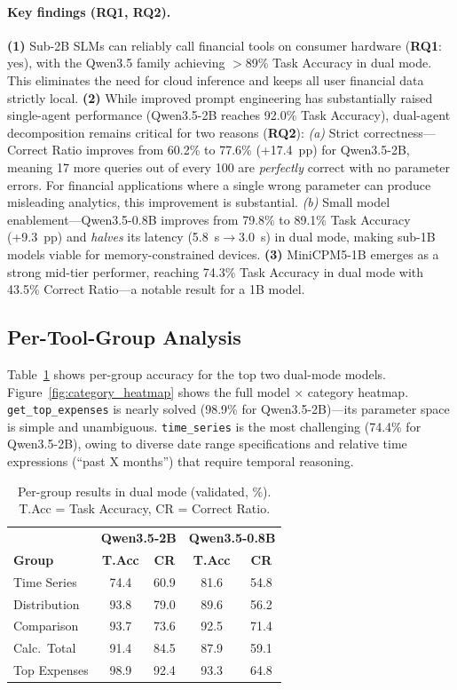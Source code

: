 \documentclass[11pt,twocolumn]{article}
\begin{document}
\paragraph{Key findings (RQ1, RQ2).}
\textbf{(1)} Sub-2B SLMs can reliably call financial tools on consumer hardware (\textbf{RQ1}: yes), with the Qwen3.5 family achieving $>$89\% Task Accuracy in dual mode.
This eliminates the need for cloud inference and keeps all user financial data strictly local.
\textbf{(2)} While improved prompt engineering has substantially raised single-agent performance (Qwen3.5-2B reaches 92.0\% Task Accuracy), dual-agent decomposition remains critical for two reasons (\textbf{RQ2}):
\emph{(a)} Strict correctness---Correct Ratio improves from 60.2\% to 77.6\% (+17.4~pp) for Qwen3.5-2B, meaning 17 more queries out of every 100 are \emph{perfectly} correct with no parameter errors.
For financial applications where a single wrong parameter can produce misleading analytics, this improvement is substantial.
\emph{(b)} Small model enablement---Qwen3.5-0.8B improves from 79.8\% to 89.1\% Task Accuracy (+9.3~pp) and \emph{halves} its latency (5.8~s$\to$3.0~s) in dual mode, making sub-1B models viable for memory-constrained devices.
\textbf{(3)} MiniCPM5-1B emerges as a strong mid-tier performer, reaching 74.3\% Task Accuracy in dual mode with 43.5\% Correct Ratio---a notable result for a 1B model.

\subsection{Per-Tool-Group Analysis}

Table~\ref{tab:category_results} shows per-group accuracy for the top two dual-mode models.
Figure~\ref{fig:category_heatmap} shows the full model $\times$ category heatmap.
\texttt{get\_top\_expenses} is nearly solved (98.9\% for Qwen3.5-2B)---its parameter space is simple and unambiguous.
\texttt{time\_series} is the most challenging (74.4\% for Qwen3.5-2B), owing to diverse date range specifications and relative time expressions (``past X months'') that require temporal reasoning.

\begin{table}[t]
\centering
\small
\begin{tabular}{@{}l|cc|cc@{}}
\toprule
& \multicolumn{2}{c|}{\textbf{Qwen3.5-2B}} & \multicolumn{2}{c}{\textbf{Qwen3.5-0.8B}} \\
\textbf{Group} & \textbf{T.Acc} & \textbf{CR} & \textbf{T.Acc} & \textbf{CR} \\
\midrule
Time Series  & 74.4 & 60.9 & 81.6 & 54.8 \\
Distribution & 93.8 & 79.0 & 89.6 & 56.2 \\
Comparison   & 93.7 & 73.6 & 92.5 & 71.4 \\
Calc.\ Total & 91.4 & 84.5 & 87.9 & 59.1 \\
Top Expenses & 98.9 & 92.4 & 93.3 & 64.8 \\
\bottomrule
\end{tabular}
\caption{Per-group results in dual mode (validated, \%). T.Acc = Task Accuracy, CR = Correct Ratio.}
\label{tab:category_results}
\end{table}
\end{document}
